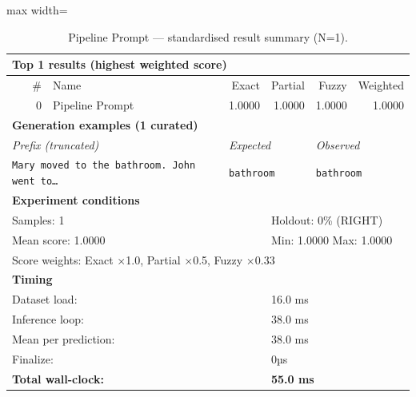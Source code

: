 \begin{table}[htbp]
\centering
\caption{Pipeline Prompt — standardised result summary (N=1).}
\label{tab:pipeline_prompt_summary}
\begin{adjustbox}{max width=\textwidth}
\begin{tabular}{r p{5cm} r r r r}
\toprule
\multicolumn{6}{l}{\textbf{Top 1 results (highest weighted score)}} \\
\midrule
\# & Name & Exact & Partial & Fuzzy & Weighted \\
\midrule
0 & Pipeline Prompt & 1.0000 & 1.0000 & 1.0000 & 1.0000 \\
\midrule
\multicolumn{6}{l}{\textbf{Generation examples (1 curated)}} \\
\midrule
\multicolumn{2}{l}{\textit{Prefix (truncated)}} & \multicolumn{2}{l}{\textit{Expected}} & \multicolumn{2}{l}{\textit{Observed}} \\
\midrule
\multicolumn{2}{l}{\texttt{Mary moved to the bathroom. John went to\ldots}} & \multicolumn{2}{l}{\texttt{bathroom}} & \multicolumn{2}{l}{\texttt{bathroom}} \\
\midrule
\multicolumn{6}{l}{\textbf{Experiment conditions}} \\
\midrule
\multicolumn{3}{l}{Samples: 1} & \multicolumn{3}{l}{Holdout: 0\% (RIGHT)} \\
\multicolumn{3}{l}{Mean score: 1.0000} & \multicolumn{3}{l}{Min: 1.0000 \quad Max: 1.0000} \\
\multicolumn{6}{l}{Score weights: Exact $\times$1.0, Partial $\times$0.5, Fuzzy $\times$0.33} \\
\midrule
\multicolumn{6}{l}{\textbf{Timing}} \\
\midrule
\multicolumn{3}{l}{Dataset load:} & \multicolumn{3}{l}{16.0 ms} \\
\multicolumn{3}{l}{Inference loop:} & \multicolumn{3}{l}{38.0 ms} \\
\multicolumn{3}{l}{Mean per prediction:} & \multicolumn{3}{l}{38.0 ms} \\
\multicolumn{3}{l}{Finalize:} & \multicolumn{3}{l}{0µs} \\
\multicolumn{3}{l}{\textbf{Total wall-clock:}} & \multicolumn{3}{l}{\textbf{55.0 ms}} \\
\bottomrule
\end{tabular}
\end{adjustbox}
\end{table}
